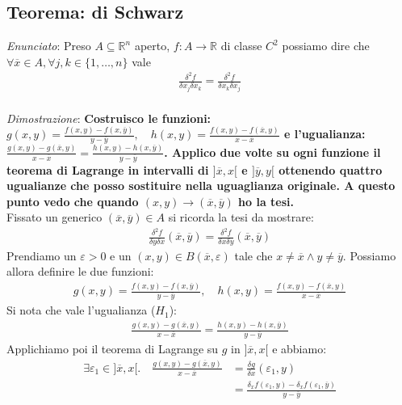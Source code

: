 \documentclass{article}
\begin{document}
\subsection{Teorema: di Schwarz}

\emph{Enunciato}: Preso $A \subseteq \mathbb{R}^n$ aperto, $f: A \to \mathbb{R}$ di classe $C^2$
possiamo dire che $\forall \overline{x} \in A, \forall j, k \in \{1, \ldots, n\}$ vale
\begin{align*}
  \frac{\delta^2 f}{\delta x_j \delta x_k} = \frac{\delta^2 f}{\delta x_k \delta x_j}
\end{align*} \\

\noindent \emph{Dimostrazione}: \textbf{Costruisco le funzioni:$
g(x, y) = \frac{f(x, y) - f(x, \overline{y})}{y-\overline{y}}, \quad
h(x, y) = \frac{f(x, y) - f(\overline{x}, y)}{x-\overline{x}}$ e l'ugualianza:
$\frac{g(x,y) - g(\overline{x}, y)}{x-\overline{x}} = \frac{h(x,y) - h(x, \overline{y})}{y-\overline{y}}$.
Applico due volte su ogni funzione il teorema di Lagrange in intervalli di $]\overline{x}, x[$ e $]\overline{y}, y[$
ottenendo quattro ugualianze che posso sostituire nella uguaglianza originale. A questo
punto vedo che quando $(x,y) \to (\overline{x},\overline{y})$ ho la tesi.
} \\
Fissato un generico $(\overline{x}, \overline{y}) \in A$ si ricorda la tesi da mostrare:
\begin{align*}
  \frac{\delta^2 f}{\delta y \delta x}(\overline{x}, \overline{y}) =
  \frac{\delta^2 f}{\delta x \delta y}(\overline{x}, \overline{y})
\end{align*}
Prendiamo un $\varepsilon > 0$ e un $(x, y) \in B(\overline{x}, \varepsilon)$
tale che $x \neq \overline{x} \wedge y \neq \overline{y}$. Possiamo allora definire le due funzioni:
\begin{align*}
  g(x, y) = \frac{f(x, y) - f(x, \overline{y})}{y-\overline{y}}, \quad
  h(x, y) = \frac{f(x, y) - f(\overline{x}, y)}{x-\overline{x}}
\end{align*}
Si nota che vale l'ugualianza ($H_1$):
\begin{align*}
  \frac{g(x,y) - g(\overline{x}, y)}{x-\overline{x}} =
  \frac{h(x,y) - h(x, \overline{y})}{y-\overline{y}}
\end{align*}
Applichiamo poi il teorema di Lagrange su $g$ in $]\overline{x}, x[$ e abbiamo:
\begin{align*}
  \exists \varepsilon_1 \in ]\overline{x}, x[. \quad 
  \frac{g(x,y) - g(\overline{x}, y)}{x-\overline{x}} &= \frac{\delta g}{\delta x}(\varepsilon_1, y) \\
  &= \frac{\delta_{x}f(\varepsilon_1, y) - \delta_{x}f(\varepsilon_1, \overline{y})}{y - \overline{y}}
\end{align*}
\end{document}
